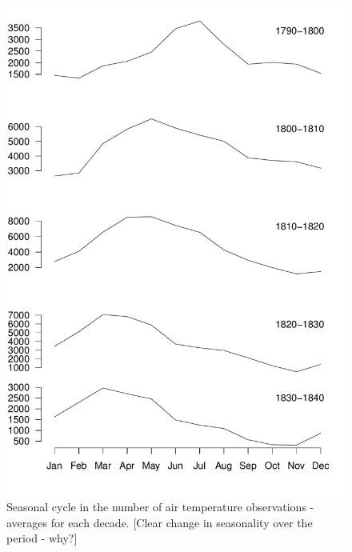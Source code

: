 \documentclass[a4paper,11pt]{article}
\begin{document}
\begin{figure}
\begin{center}
\includegraphics[angle=0, width=1.0\textwidth]{../obs_count/ob_seasonal}
\caption{Seasonal cycle in the number of air temperature observations - averages for each decade. [Clear change in seasonality over the period - why?]}
\label{ob_seasonal}
\end{center}
\end{figure}
\end{document}
